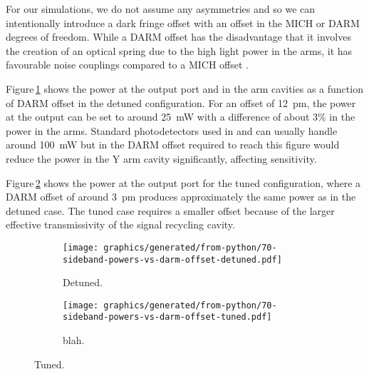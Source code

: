 For our simulations, we do not assume any asymmetries and so we can intentionally introduce a dark fringe offset with an offset in the \gls{MICH} or \gls{DARM} degrees of freedom. While a \gls{DARM} offset has the disadvantage that it involves the creation of an optical spring due to the high light power in the arms, it has favourable noise couplings compared to a \gls{MICH} offset \cite{Vajente2011}.

Figure\,\ref{fig:sideband-powers-vs-darm-offset-detuned} shows the power at the output port and in the arm cavities as a function of \gls{DARM} offset in the detuned configuration. For an offset of \SI{12}{\pico\meter}, the power at the output can be set to around \SI{25}{\milli\watt} with a difference of about 3\% in the power in the arms. Standard photodetectors used in \ALIGO{} and \AVIRGO{} can usually handle around \SI{100}{\milli\watt} but in \ETLF{} the \gls{DARM} offset required to reach this figure would reduce the power in the Y arm cavity significantly, affecting sensitivity.

Figure\,\ref{fig:sideband-powers-vs-darm-offset-tuned} shows the power at the output port for the tuned configuration, where a \gls{DARM} offset of around \SI{3}{\pico\meter} produces approximately the same power as in the detuned case. The tuned case requires a smaller offset because of the larger effective transmissivity of the signal recycling cavity. 

\begin{figure}
  \centering
  \begin{subfigure}{.49\textwidth}
    \texttt{[image: graphics/generated/from-python/70-sideband-powers-vs-darm-offset-detuned.pdf]}
    \caption[Carrier power at the output port of \ETLF{} in detuned configuration as a function of differential arm cavity offset]{\label{fig:sideband-powers-vs-darm-offset-detuned}Detuned.}
  \end{subfigure}
  \hfill
  \begin{subfigure}{.49\textwidth}
    \texttt{[image: graphics/generated/from-python/70-sideband-powers-vs-darm-offset-tuned.pdf]}
    \caption[Carrier power at the output port of \ETLF{} in tuned configuration as a function of differential arm cavity offset]{\label{fig:sideband-powers-vs-darm-offset-tuned}blah.}
  \end{subfigure}
  \caption[Carrier power at the output port of \ETLF{} as a function of differential arm cavity offset]{\label{fig:sideband-powers-vs-darm-offset}Tuned.}
\end{figure}

